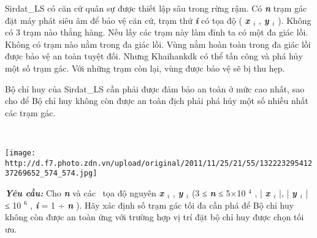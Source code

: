 Sirdat\_LS có căn cứ quân sự được thiết lập sâu trong rừng rậm. Có \textbf{\emph{ n }} trạm gác đặt máy phát siêu âm để bảo vệ căn cứ, trạm thứ \textbf{\emph{ i }} có tọa độ ( \textbf{\emph{ x $_ i $}} , \textbf{\emph{ y $_ i $}} ). Không có 3 trạm nào thẳng hàng. Nếu lấy các trạm này làm đỉnh ta có một đa giác lồi. Không có trạm nào nằm trong đa giác lồi. Vùng nằm hoàn toàn trong đa giác lồi được bảo vệ an toàn tuyệt đối. Nhưng Khaihankdk có thể tấn công và phá hủy một số trạm gác. Với những trạm còn lại, vùng được bảo vệ sẽ bị thu hẹp.

Bộ chỉ huy của Sirdat\_LS cần phải được đảm bảo an toàn ở mức cao nhất, sao cho để Bộ chỉ huy không còn được an toàn địch phải phá hủy một số nhiều nhất các trạm gác.

 


\texttt{[image: http://d.f7.photo.zdn.vn/upload/original/2011/11/25/21/55/13222329541237269652\_574\_574.jpg]}

\textbf{\emph{Yêu cầu: }} Cho \textbf{\emph{ n }} và các  tọa độ nguyên \textbf{\emph{ x $_ i $}} , \textbf{\emph{ y $_ i $}} (3 ≤ \textbf{\emph{ n }} ≤ 5×10 $^ 4 $ , | \textbf{\emph{ x $_ i $}} |, | \textbf{\emph{ y $_ i $}} | ≤ 10 $^ 6 $ , \textbf{\emph{ i }} = 1 ÷ \textbf{\emph{ n }} ). Hãy xác định số trạm gác tối đa cần phá để Bộ chỉ huy không còn được an toàn ứng với trường hợp vị trí đặt bộ chỉ huy được chọn tối ưu.